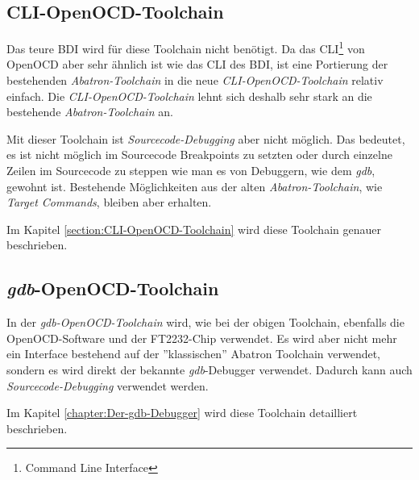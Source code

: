 \subsection{CLI-OpenOCD-Toolchain}
Das teure BDI wird für diese Toolchain nicht  benötigt.
Da das CLI\footnote{Command Line Interface} von OpenOCD aber sehr ähnlich ist wie das CLI des BDI, ist eine Portierung der bestehenden \textit{Abatron-Toolchain} in die neue \textit{CLI-OpenOCD-Toolchain} relativ einfach.
Die \textit{CLI-OpenOCD-Toolchain} lehnt sich deshalb sehr stark an die bestehende \textit{Abatron-Toolchain} an.

Mit dieser Toolchain ist \textit{Sourcecode-Debugging} aber nicht möglich.
Das bedeutet, es ist nicht möglich im Sourcecode Breakpoints zu setzten oder durch einzelne Zeilen im Sourcecode zu steppen wie man es von Debuggern, wie dem \textit{gdb}, gewohnt ist.
Bestehende Möglichkeiten aus der alten \textit{Abatron-Toolchain}, wie \textit{Target Commands}, bleiben aber erhalten.

Im Kapitel \ref{section:CLI-OpenOCD-Toolchain} wird diese Toolchain genauer beschrieben.


\subsection{\textit{gdb}-OpenOCD-Toolchain}
In der \textit{gdb-OpenOCD-Toolchain} wird, wie bei der obigen Toolchain, ebenfalls die OpenOCD-Software und der FT2232-Chip verwendet.
Es wird aber nicht mehr ein Interface bestehend auf der ''klassischen'' Abatron Toolchain verwendet, sondern es wird direkt der bekannte \textit{gdb}-Debugger verwendet.
Dadurch kann auch \textit{Sourcecode-Debugging} verwendet werden.

Im Kapitel \ref{chapter:Der-gdb-Debugger} wird diese Toolchain detailliert beschrieben.
